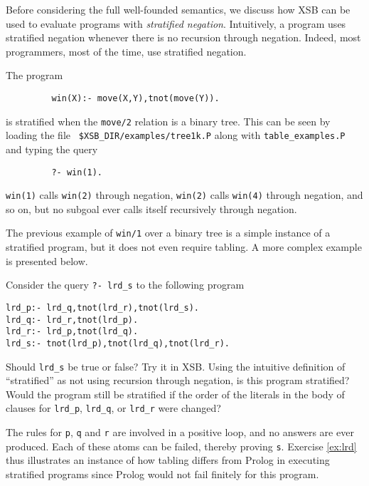 Before considering the full well-founded semantics, we discuss how XSB
can be used to evaluate programs with {\em stratified negation}.
Intuitively, a program uses stratified negation whenever there is no
recursion through negation.  Indeed, most programmers, most of the
time, use stratified negation.  

\begin{exercise} \label{ex:win1}
The program
\begin{verbatim}
         win(X):- move(X,Y),tnot(move(Y)).
\end{verbatim}
is stratified when the {\tt move/2} relation is a binary tree.  This
can be seen by loading the file {\tt
\verb|$XSB_DIR/examples/|tree1k.P} along with {\tt table\_examples.P}
and typing the query
\begin{verbatim}
         ?- win(1).
\end{verbatim}
{\tt win(1)} calls {\tt win(2)} through negation, {\tt win(2)} calls
{\tt win(4)} through negation, and so on, but no subgoal ever calls
itself recursively through negation.
\end{exercise}

The previous example of {\tt win/1} over a binary tree is a simple
instance of a stratified program, but it does not even require
tabling.  A more complex example is presented below.

\begin{exercise} \label{ex:lrd}
Consider the query {\tt ?- lrd\_s} to the following program
\begin{verbatim}
lrd_p:- lrd_q,tnot(lrd_r),tnot(lrd_s).
lrd_q:- lrd_r,tnot(lrd_p).
lrd_r:- lrd_p,tnot(lrd_q).
lrd_s:- tnot(lrd_p),tnot(lrd_q),tnot(lrd_r). 
\end{verbatim}
Should {\tt lrd\_s} be true or false?  Try it in XSB.  Using the
intuitive definition of ``stratified'' as not using recursion through
negation, is this program stratified?  Would the program still be
stratified if the order of the literals in the body of clauses for
{\tt lrd\_p}, {\tt lrd\_q}, or {\tt lrd\_r} were changed?
\end{exercise}

The rules for {\tt p}, {\tt q} and {\tt r} are involved in a positive
loop, and no answers are ever produced.  Each of these atoms can be
failed, thereby proving {\tt s}.  Exercise \ref{ex:lrd} thus
illustrates an instance of how tabling differs from Prolog in
executing stratified programs since Prolog would not fail finitely for
this program.

